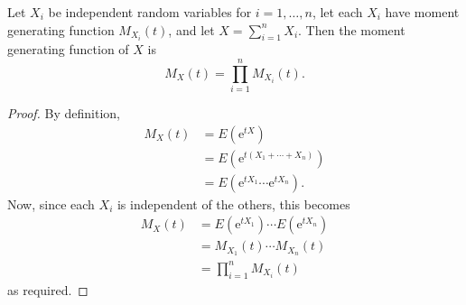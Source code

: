 \documentclass[12pt]{article}
\newcommand{\e}{\mathrm{e}} %
\begin{document}
Let $X_i$ be independent random variables for $i=1,\dotsc ,n$, let each $X_i$ have moment generating function $M_{X_i} (t)$, and let $X=\sum_{i=1}^n X_i$. Then the moment generating function of $X$ is
\[
  M_X(t)=\prod_{i=1}^n M_{X_i}(t)
.\]

\begin{proof}
By definition,
\begin{align*}
  M_X(t)&=E\left(\e^{tX}\right)\\
        &=E\left(\e^{t\left(X_1+\dotsb+X_n\right)}\right)\\
        &=E\left(\e^{tX_1}\dotsm\e^{tX_n}\right)
.\end{align*}
Now, since each $X_i$ is independent of the others, this becomes
\begin{align*}
  M_X(t)&=E\left(\e^{tX_1}\right)\dotsm E\left(\e^{tX_n}\right)\\
        &=M_{X_1}(t)\dotsm M_{X_n}(t)\\
        &=\prod_{i=1}^n M_{X_i}(t)
\end{align*}
as required.
\end{proof} 
\end{document}

